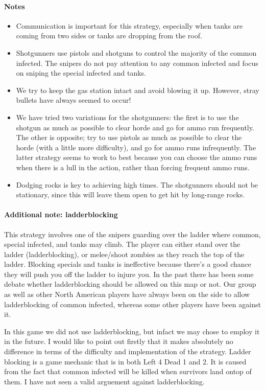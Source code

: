 \paragraph{Notes}
\begin{itemize}
\item Communication is important for this strategy, especially when tanks are coming from two sides or tanks are dropping from the roof.
\item Shotgunners use pistols and shotguns to control the majority of the common infected. The snipers do not pay attention to any common infected and focus on sniping the special infected and tanks.
\item We try to keep the gas station intact and avoid blowing it up. However, stray bullets have always seemed to occur!
\item We have tried two variations for the shotgunners: the first is to use the shotgun as much as possible to clear horde and go for ammo run frequently. The other is opposite; try to use pistols as much as possible to clear the horde (with a little more difficulty), and go for ammo runs infrequently. The latter strategy seems to work to best because you can choose the ammo runs when there is a lull in the action, rather than forcing frequent ammo runs.
\item Dodging rocks is key to achieving high times. The shotgunners should not be stationary, since this will leave them open to get hit by long-range rocks.
\end{itemize}

\paragraph{Additional note: ladderblocking}
This strategy involves one of the snipers guarding over the ladder where common, special infected, and tanks may climb. The player can either stand over the ladder (ladderblocking), or melee/shoot zombies as they reach the top of the ladder. Blocking specials and tanks is ineffective because there's a good chance they will push you off the ladder to injure you. In the past there has been some debate whether ladderblocking should be allowed on this map or not. Our group as well as other North American players have always been on the side to allow ladderblocking of common infected, whereas some other players have been against it.

In this game we did not use ladderblocking, but infact we may chose to employ it in the future. I would like to point out firstly that it makes absolutely no difference in terms of the difficulty and implementation of the strategy. Ladder blocking is a game mechanic that is in both Left 4 Dead 1 and 2. It is caused from the fact that common infected will be killed when survivors land ontop of them. I have not seen a valid arguement against ladderblocking.

